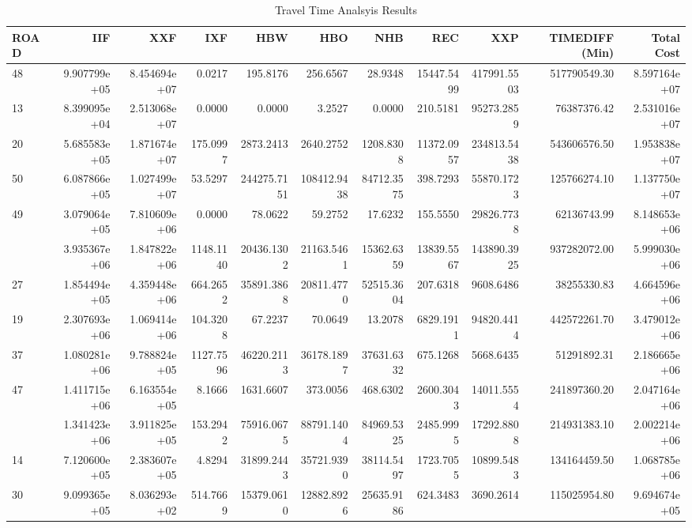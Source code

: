 \begin{table}

\caption{\label{tab:timeresults}Travel Time Analsyis Results}
\centering
\begin{tabular}[t]{lrrrrrrrrrr}
\toprule
ROAD & IIF & XXF & IXF & HBW & HBO & NHB & REC & XXP & TIMEDIFF (Min) & Total Cost\\
\midrule
48 & 9.907799e+05 & 8.454694e+07 & 0.0217 & 195.8176 & 256.6567 & 28.9348 & 15447.5499 & 417991.5503 & 517790549.30 & 8.597164e+07\\
13 & 8.399095e+04 & 2.513068e+07 & 0.0000 & 0.0000 & 3.2527 & 0.0000 & 210.5181 & 95273.2859 & 76387376.42 & 2.531016e+07\\
20 & 5.685583e+05 & 1.871674e+07 & 175.0997 & 2873.2413 & 2640.2752 & 1208.8308 & 11372.0957 & 234813.5438 & 543606576.50 & 1.953838e+07\\
50 & 6.087866e+05 & 1.027499e+07 & 53.5297 & 244275.7151 & 108412.9438 & 84712.3575 & 398.7293 & 55870.1723 & 125766274.10 & 1.137750e+07\\
49 & 3.079064e+05 & 7.810609e+06 & 0.0000 & 78.0622 & 59.2752 & 17.6232 & 155.5550 & 29826.7738 & 62136743.99 & 8.148653e+06\\
\addlinespace
18 & 3.935367e+06 & 1.847822e+06 & 1148.1140 & 20436.1302 & 21163.5461 & 15362.6359 & 13839.5567 & 143890.3925 & 937282072.00 & 5.999030e+06\\
27 & 1.854494e+05 & 4.359448e+06 & 664.2652 & 35891.3868 & 20811.4770 & 52515.3604 & 207.6318 & 9608.6486 & 38255330.83 & 4.664596e+06\\
19 & 2.307693e+06 & 1.069414e+06 & 104.3208 & 67.2237 & 70.0649 & 13.2078 & 6829.1911 & 94820.4414 & 442572261.70 & 3.479012e+06\\
37 & 1.080281e+06 & 9.788824e+05 & 1127.7596 & 46220.2113 & 36178.1897 & 37631.6332 & 675.1268 & 5668.6435 & 51291892.31 & 2.186665e+06\\
47 & 1.411715e+06 & 6.163554e+05 & 8.1666 & 1631.6607 & 373.0056 & 468.6302 & 2600.3043 & 14011.5554 & 241897360.20 & 2.047164e+06\\
\addlinespace
38 & 1.341423e+06 & 3.911825e+05 & 153.2942 & 75916.0675 & 88791.1404 & 84969.5325 & 2485.9995 & 17292.8808 & 214931383.10 & 2.002214e+06\\
14 & 7.120600e+05 & 2.383607e+05 & 4.8294 & 31899.2443 & 35721.9390 & 38114.5497 & 1723.7055 & 10899.5483 & 134164459.50 & 1.068785e+06\\
30 & 9.099365e+05 & 8.036293e+02 & 514.7669 & 15379.0610 & 12882.8926 & 25635.9186 & 624.3483 & 3690.2614 & 115025954.80 & 9.694674e+05\\

\end{tabular}
\end{table}
